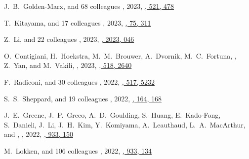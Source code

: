 \begin{etaremune}
\item
J.~B.~Golden-Marx, and 68 colleagues
,
2023, \href{https://ui.adsabs.harvard.edu/abs/2023MNRAS.521..478G}{\mnras, 521, 478}

\item
T.~Kitayama, and 17 colleagues
,
2023, \href{https://ui.adsabs.harvard.edu/abs/2023PASJ...75..311K}{\pasj, 75, 311}

\item
Z.~Li, and 22 colleagues
,
2023, \href{https://ui.adsabs.harvard.edu/abs/2023JCAP...02..046L}{\jcap, 2023, 046}

\item
O.~Contigiani, H.~Hoekstra, M.~M.~Brouwer, A.~Dvornik, M.~C.~Fortuna, \myself, Z.~Yan, and M.~Vakili,
,
2023, \href{https://ui.adsabs.harvard.edu/abs/2023MNRAS.518.2640C}{\mnras, 518, 2640}


\item
F.~Radiconi, and 30 colleagues
,
2022, \href{https://ui.adsabs.harvard.edu/abs/2022MNRAS.517.5232R}{\mnras, 517, 5232}

\item
S.~S.~Sheppard, and 19 colleagues
,
2022, \href{https://ui.adsabs.harvard.edu/abs/2022AJ....164..168S}{\aj, 164, 168}

\item
J.~E.~Greene, J.~P.~Greco, A.~D.~Goulding, S.~Huang, E.~Kado-Fong, S.~Danieli, J.~Li, J.~H.~Kim, Y.~Komiyama, A.~Leauthaud, L.~A.~MacArthur, and \myself,
,
2022, \href{https://ui.adsabs.harvard.edu/abs/2022ApJ...933..150G}{\apj, 933, 150}

\item
M.~Lokken, and 106 colleagues
,
2022, \href{https://ui.adsabs.harvard.edu/abs/2022ApJ...933..134L}{\apj, 933, 134}


\end{etaremune}

